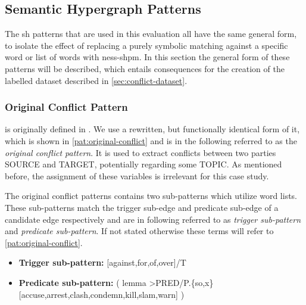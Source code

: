 \documentclass[11pt, numbers=noenddot]{scrreprt}
\let\citef\cite  %
\let\cite\parencite  %
\begin{document}
%


\subsection{Semantic Hypergraph Patterns}
\label{sec:sh-patterns}
The \gls{sh} patterns that are used in this evaluation all have the same general form, to isolate the effect of replacing a purely symbolic matching against a specific word or list of words with \gls{ness-shpm}. In this section the general form of these patterns will be described, which entails consequences for the creation of the labelled dataset described in \cref{sec:conflict-dataset}. 



\subsubsection{Original Conflict Pattern}
 is originally defined in \citef[p.~22]{menezesSemanticHypergraphs2021}. We use a rewritten, but functionally identical form of it, which is shown in \cref{pat:original-conflict} and is in the following referred to as the \textit{original conflict pattern}. It is used to extract conflicts between two parties \textsf{SOURCE} and \textsf{TARGET}, potentially regarding some \textsf{TOPIC}. As mentioned before, the assignment of these variables is irrelevant for this case study.

The original conflict patterns contains two sub-patterns which utilize word lists. These sub-patterns match the trigger sub-edge and predicate sub-edge of a candidate edge respectively and are in following referred to as \textit{trigger sub-pattern} and \textit{predicate sub-pattern}. If not stated otherwise these terms will refer to \cref{pat:original-conflict}. 

\begin{itemize}
	\item \textbf{\textsf{Trigger sub-pattern:}} \textsf{[against,for,of,over]/T}
	\item \textbf{\textsf{Predicate sub-pattern:}}
		\textsf{( lemma >PRED/P.\{so,x\}} \\
		\hspace*{4cm} \textsf{[accuse,arrest,clash,condemn,kill,slam,warn] )}
\end{itemize}
\end{document}
